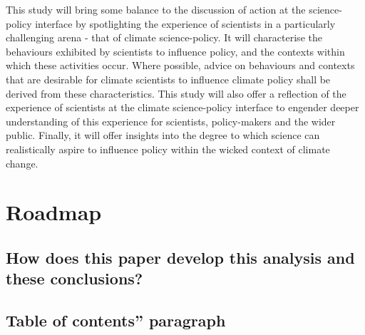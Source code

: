 This study will bring some balance to the discussion of action at the science-policy interface by spotlighting the experience of scientists in a particularly challenging arena - that of climate science-policy. It will characterise the behaviours exhibited by scientists to influence policy, and the contexts within which these activities occur. Where possible, advice on behaviours and contexts that are desirable for climate scientists to influence climate policy shall be derived from these characteristics. This study will also offer a reflection of the experience of scientists at the climate science-policy interface to engender deeper understanding of this experience for scientists, policy-makers and the wider public. Finally, it will offer insights into the degree to which science can realistically aspire to influence policy within the wicked context of climate change.

\section{Roadmap}
\subsection{How does this paper develop this analysis and these conclusions?}
\subsection{Table of contents” paragraph}
